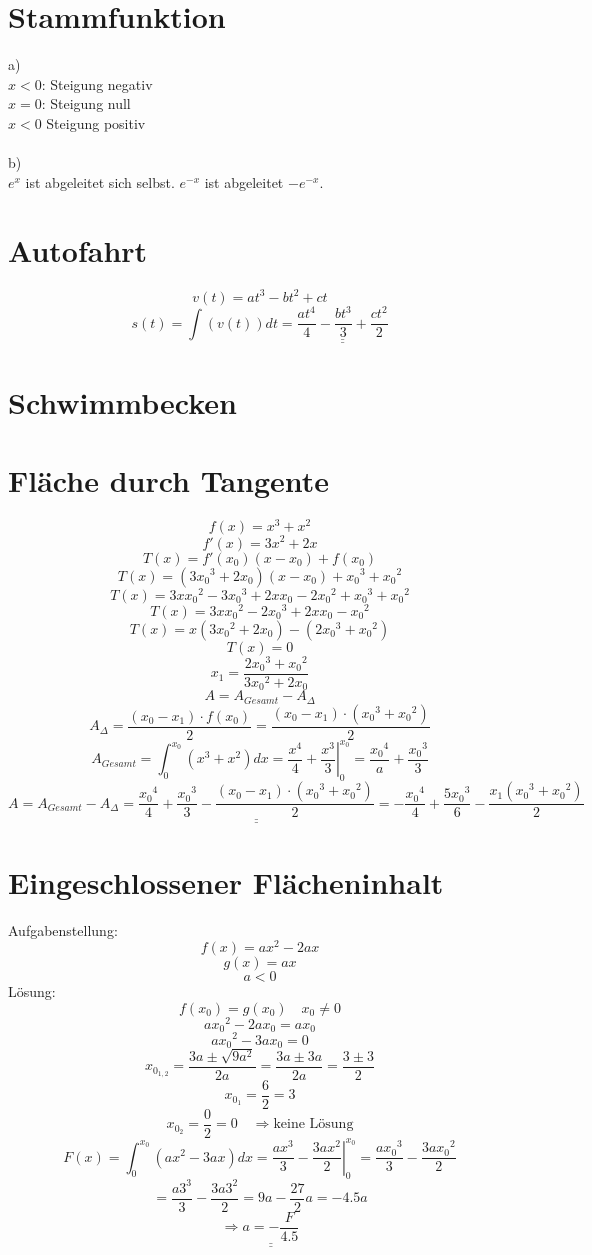 \section{Stammfunktion}
a)\\
$x<0$: Steigung negativ\\
$x=0$: Steigung null\\
$x<0$ Steigung positiv\\\\
b)\\
$e^x$ ist abgeleitet sich selbst. $e^{-x}$ ist abgeleitet $-e^{-x}$. 

\section{Autofahrt}
\[ v(t) = a t^3 - b t^2 + c t \]
\[ s(t) = \int (v(t)) dt = \underline{\underline{\frac{a t^4}{4} - \frac{b t^3}{3} + \frac{c t^2}{2}}} \]

\section{Schwimmbecken}

\section{Fläche durch Tangente}
\[ f(x) = x^3 + x^2 \]
\[ f'(x) = 3 x^2 + 2 x \]
\[ T(x) = f'(x_0)(x - x_0) + f(x_0) \]
\[ T(x) = (3 {x_0}^3 + 2 x_0)(x-x_0) + {x_0}^3 + {x_0}^2 \]
\[ T(x) = 3 x {x_0}^2 - 3 {x_0}^3 + 2 x x_0 - 2 {x_0}^2 + {x_0}^3 + {x_0}^2 \]
\[ T(x) = 3 x {x_0}^2 - 2 {x_0}^3 + 2 x x_0 - {x_0}^2 \]
\[ T(x) = x(3 {x_0}^2 + 2 x_0) - (2 {x_0}^3 + {x_0}^2) \]
\[ T(x) = 0 \]
\[ x_1 = \frac{2 {x_0}^3 + {x_0}^2}{3 {x_0}^2 + 2 x_0} \]
\[ A = A_{Gesamt} - A_\Delta \]
\[ A_\Delta = \frac{(x_0 - x_1) \cdot f(x_0)}{2} = \frac{(x_0 - x_1) \cdot ({x_0}^3 + {x_0}^2)}{2} \]
\[ A_{Gesamt} = \int_0^{x_0} (x^3 + x^2) dx = \left.\frac{x^4}{4} + \frac{x^3}{3} \right|_{0}^{x_0} = \frac{{x_0}^4}{a} + \frac{{x_0}^3}{3} \]
\[ A = A_{Gesamt} - A_\Delta = \underline{\underline{\frac{{x_0}^4}{4} + \frac{{x_0}^3}{3} - \frac{(x_0 - x_1) \cdot ({x_0}^3 + {x_0}^2)}{2}}} = -\frac{{x_0}^4}{4} + \frac{5 {x_0}^3}{6} - \frac{x_1 ({x_0}^3 + {x_0}^2)}{2} \]

\section{Eingeschlossener Flächeninhalt}
Aufgabenstellung: 
\[ f(x) = ax^2 - 2ax \]
\[ g(x) = ax \]
\[ a < 0 \]
Lösung: 
\[ f(x_0) = g(x_0) \quad x_0 \neq 0 \]
\[ a{x_0}^2 - 2ax_0 = ax_0 \]
\[ a{x_0}^2 - 3ax_0 = 0 \]
\[ x_{0_{1,2}} = \frac{3a \pm \sqrt{9a^2}}{2a} = \frac{3a \pm 3a}{2a} = \frac{3 \pm 3}{2} \]
\[ x_{0_1} = \frac{6}{2} = 3 \]
\[ x_{0_2} = \frac{0}{2} = 0 \quad \Rightarrow \text{keine Lösung} \]
\[ F(x) = \int_0^{x_0} (ax^2 - 3ax) dx = \left.\frac{ax^3}{3} - \frac{3ax^2}{2}\right|_0^{x_0} = \frac{a{x_0}^3}{3} - \frac{3a{x_0}^2}{2} \]
\[ = \frac{a{3}^3}{3} - \frac{3a{3}^2}{2} = 9a - \frac{27}{2}a = -4.5a \]
\[ \Rightarrow \underline{\underline{a = -\frac{F}{4.5}}} \]

